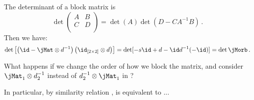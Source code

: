 The determinant of a block matrix is
\[
\det
\left(
\begin{array}{cc}
A & B \\
C & D \\
\end{array}
\right)
=
\det(A)\det(D-CA^{-1}B)
\, .
\]
Then we have:
\[
\det \left[\left( \id-\jMat \otimes \shift^{-1} \right) \left( \id_{[2\times 2]} \otimes \shift \right)\right]
=
\det [-s \id + \shift - \id \shift^{-1} (-\id)]
=
\det \jMorb
\,.
\]


What happens if we change the order of how we block the matrix, and
consider ${\mathbf{\jMat}_1} \otimes \shift_2^{-1}$ instead of
$\shift_2^{-1}\otimes{\mathbf{\jMat}_1}$ in ?

In particular, by similarity relation ,
 is equivalent to ...

